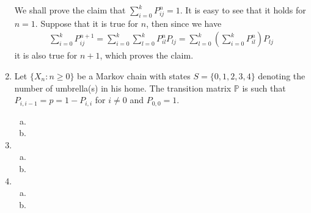 \documentclass[a4paper,10pt]{article}
\theoremstyle{definition}
\begin{document}
\begin{enumerate}
We shall prove the claim that $\sum^{k}_{i=0}P^n_{ij}=1$. It is easy to see that it holds for $n=1$. Suppose that it is true for $n$, then since we have
\begin{align*}
\sum^{k}_{i=0}P^{n+1}_{ij} = \sum^{k}_{i=0}\sum_{l=0}^{k}P^{n}_{il}P_{lj}= \sum_{l=0}^{k}\left(\sum^{k}_{i=0}P^{n}_{il}\right)P_{lj}
\end{align*}
it is also true for $n+1$, which proves the claim.





\item Let $\{X_n:n\geq 0\}$ be a Markov chain with states $S=\{0,1,2,3,4\}$ denoting the number of umbrella(s) in his home. The transition matrix $\mathbb{P}$ is such that $P_{i,i-1}=p=1-P_{i,i}$ for $i\neq 0$ and $P_{0,0}=1$.


\begin{enumerate}[(a)]
\item
\item
\end{enumerate}
\item
\begin{enumerate}[(a)]
\item
\item
\end{enumerate}
\item
\begin{enumerate}[(a)]
\item
\item
\end{enumerate}
\end{enumerate}
\end{document}
